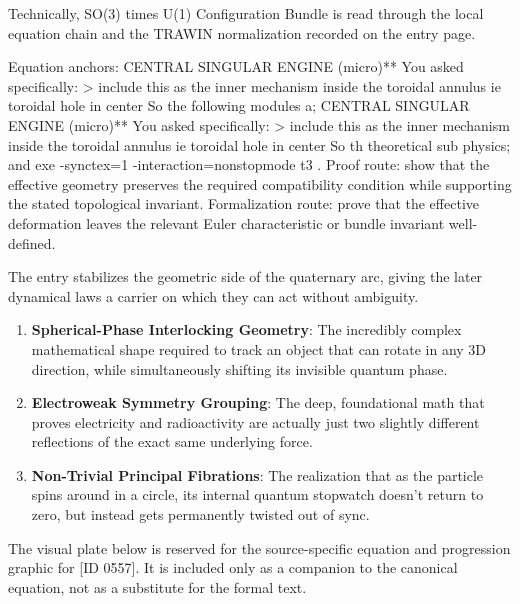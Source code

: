 Technically, SO(3) times U(1) Configuration Bundle is read through the local equation chain and the TRAWIN normalization recorded on the entry page.

Equation anchors: CENTRAL SINGULAR ENGINE (micro)** You asked specifically: > include this as the inner mechanism inside the toroidal annulus ie toroidal hole in center So the following modules a; CENTRAL SINGULAR ENGINE (micro)** You asked specifically: > include this as the inner mechanism inside the toroidal annulus ie toroidal hole in center So th theoretical sub physics; and exe -synctex=1 -interaction=nonstopmode t3 . Proof route: show that the effective geometry preserves the required compatibility condition while supporting the stated topological invariant. Formalization route: prove that the effective deformation leaves the relevant Euler characteristic or bundle invariant well-defined.

The entry stabilizes the geometric side of the quaternary arc, giving the later dynamical laws a carrier on which they can act without ambiguity.
\endgroup

\begin{enumerate}[leftmargin=1.6em,itemsep=6pt,topsep=4pt]
\item \textbf{Spherical-Phase Interlocking Geometry}: The incredibly complex mathematical shape required to track an object that can rotate in any 3D direction, while simultaneously shifting its invisible quantum phase.
\item \textbf{Electroweak Symmetry Grouping}: The deep, foundational math that proves electricity and radioactivity are actually just two slightly different reflections of the exact same underlying force.
\item \textbf{Non-Trivial Principal Fibrations}: The realization that as the particle spins around in a circle, its internal quantum stopwatch doesn't return to zero, but instead gets permanently twisted out of sync.
\end{enumerate}

\begingroup\footnotesize\sloppy
The visual plate below is reserved for the source-specific equation and progression graphic for [ID 0557]. It is included only as a companion to the canonical equation, not as a substitute for the formal text.
\par\endgroup
\ifTZPDarkEdition
{}
\fi


